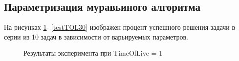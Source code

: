 \documentclass{article}
\begin{document}
\subsection{Параметризация муравьиного алгоритма}
На рисунках \hyperref[testTOL1]{\ref{testTOL1}}- \hyperref[testTOL30]{\ref{testTOL30}} изображен процент успешного решения задачи в серии из 10 задач в зависимости от варьируемых параметров.

\begin{figure}[H]
		 	\caption{Результаты эксперимента при TimeOfLive = 1}
		 	\label{testTOL1}
	 	\end{figure}
\end{document}
